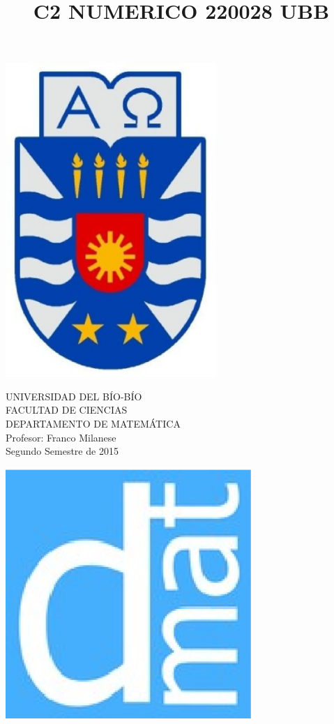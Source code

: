 \documentclass[11pt]{article}
\begin{document}
\title{C2 NUMERICO 220028 UBB}

{\begin{minipage}{2cm}
\hspace*{1cm}\includegraphics[width=0.6\textwidth]{escubo-ubb.eps}
\end{minipage}
\begin{minipage}{12cm}
\small
{\bf \rm 
{
\begin{center}
{\footnotesize UNIVERSIDAD DEL B\'IO-B\'IO} \\
{\scriptsize FACULTAD DE CIENCIAS}  \\
{\scriptsize DEPARTAMENTO DE MATEM\'ATICA}  \\
{\scriptsize Profesor:  Franco Milanese}\\
{\scriptsize Segundo Semestre de 2015}
\end{center}
}}
\end{minipage}}
{\begin{minipage}{2cm}
\hspace*{-0.5cm}\vspace*{-0.05cm}\includegraphics[width=0.7\textwidth]{escudo-dmat.eps}
\end{minipage}}
\end{document}
